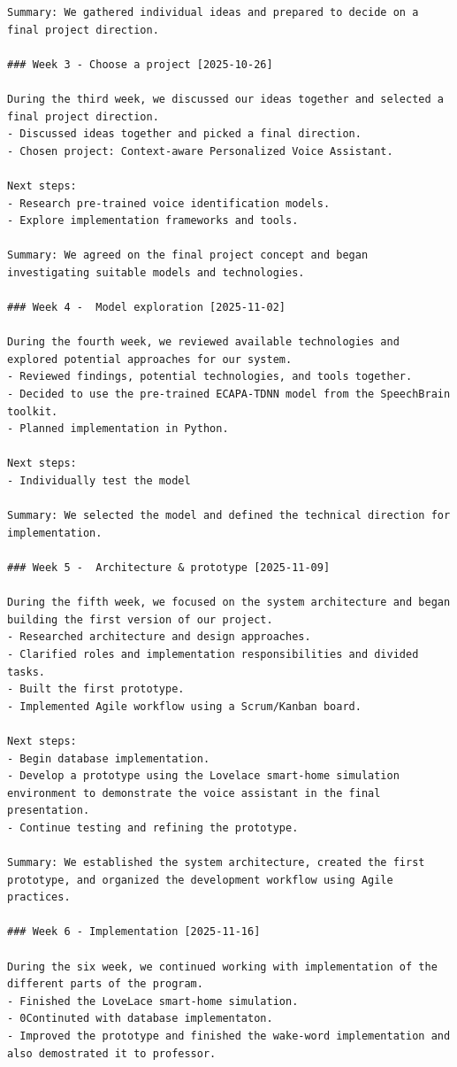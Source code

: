 \documentclass[conference]{IEEEtran}
\begin{document}
\begin{lstlisting}
Summary: We gathered individual ideas and prepared to decide on a final project direction.

### Week 3 - Choose a project [2025-10-26]

During the third week, we discussed our ideas together and selected a final project direction.
- Discussed ideas together and picked a final direction.
- Chosen project: Context-aware Personalized Voice Assistant.

Next steps:
- Research pre-trained voice identification models.
- Explore implementation frameworks and tools.

Summary: We agreed on the final project concept and began investigating suitable models and technologies.

### Week 4 -  Model exploration [2025-11-02]

During the fourth week, we reviewed available technologies and explored potential approaches for our system.
- Reviewed findings, potential technologies, and tools together.
- Decided to use the pre-trained ECAPA-TDNN model from the SpeechBrain toolkit.
- Planned implementation in Python.

Next steps:
- Individually test the model

Summary: We selected the model and defined the technical direction for implementation.

### Week 5 -  Architecture & prototype [2025-11-09]

During the fifth week, we focused on the system architecture and began building the first version of our project.
- Researched architecture and design approaches.
- Clarified roles and implementation responsibilities and divided tasks.
- Built the first prototype.
- Implemented Agile workflow using a Scrum/Kanban board.

Next steps:
- Begin database implementation.
- Develop a prototype using the Lovelace smart-home simulation environment to demonstrate the voice assistant in the final presentation.
- Continue testing and refining the prototype.

Summary: We established the system architecture, created the first prototype, and organized the development workflow using Agile practices.

### Week 6 - Implementation [2025-11-16]

During the six week, we continued working with implementation of the different parts of the program.
- Finished the LoveLace smart-home simulation.
- 0Continuted with database implementaton.
- Improved the prototype and finished the wake-word implementation and also demostrated it to professor.


\end{lstlisting}
\end{document}
